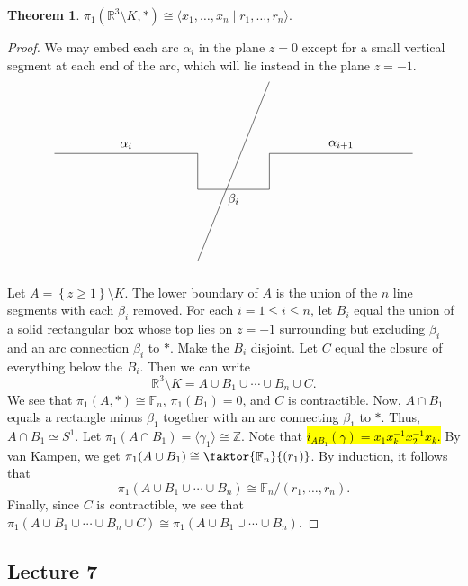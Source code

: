 \documentclass[10pt,letterpaper,cm]{nupset}
\theoremstyle{definition}
\theoremstyle{theorem}
\newtheorem{theorem}[definition]{Theorem}
\theoremstyle{remark}
\newcommand{\R}{\mathbb{R}}
\newcommand{\Z}{\mathbb Z}
\newcommand{\1}{\mathbb{1}}
\newcommand{\0}{\vec 0}
\begin{document}
\begin{theorem}
$\pi_1(\R^3 \setminus K, \ast) \cong \langle x_1, \ldots, x_n \mid r_1, \ldots, r_n \rangle$.
\end{theorem}
\begin{proof}
We may embed each arc $\alpha_i$ in the plane $z=0$ except for a small vertical segment at each end of the arc, which will lie instead in the plane $z={-1}$. 
\[
\begin{tikzpicture}
  \draw (0,1) node (nodeA) [below]  {} -- (4,1) node (nodeB) [above] {} node [midway, above, sloped] (EdgeAB) {$\alpha_i$} -- (4,0) node [below] (nodeC) {} node [midway, above, sloped] (EdgeBC) {} -- (6,0) node [above] (nodeD) {} node [midway, below, sloped] (EdgeCD) {$\beta_i$} -- (6,1) node (nodeE) [below]  {} -- (10,1) node (nodeF) [below]  {} node [midway, above, sloped] (EdgeEF) {$\alpha_{i+1}$} 
(4,-2) node (nodeG) [below]  {} --  (6,3) node (nodeH) [below]  {};
\end{tikzpicture}
\]
Let $A = \left\{z\geq 1 \right\}\setminus K$. 
The lower boundary of $A$ is  the union of the $n$ line segments with each $\beta_i$ removed. For each $i=1\leq i \leq n$, let $B_i$ equal the union of a solid rectangular box whose top lies on $z={-1}$ surrounding but excluding $\beta_i$ and an arc connection $\beta_i$ to $\ast$. Make the $B_i$ disjoint. Let $C$ equal the closure of everything below the $B_i$. 
Then  we can write $$\R^3 \setminus K = A \cup B_1 \cup \cdots \cup B_n \cup C.$$ We see that $\pi_1(A, \ast) \cong \mathbb{F}_n$, $\pi_1(B_1) =0$, and $C$ is contractible. Now, $A \cap B_1$ equals a rectangle minus $\beta_1$ together with an arc connecting $\beta_1$ to $\ast$. Thus, $A \cap B_1 \simeq S^1$. Let $\pi_1(A \cap B_1) = \langle \gamma_1 \rangle \cong \Z$. Note that \hl{$i_{AB_1}(\gamma) = x_1x_k^{-1}x_2^{-1}x_k$.} By van Kampen, we get $\pi_1(A \cup B_1) \cong \faktor{\mathbb{F}_n}{(r_1)}$. By induction, it follows that $$\pi_1(A \cup B_1 \cup \cdots \cup  B_n) \cong \mathbb{F}_n/\left(r_1, \ldots, r_n\right).$$ Finally, since $C$ is contractible, we see that $\pi_1(A \cup B_1 \cup \cdots \cup  B_n \cup C) \cong \pi_1(A \cup B_1 \cup \cdots \cup  B_n).$
\end{proof}

\subsection{Lecture 7}
\end{document}
